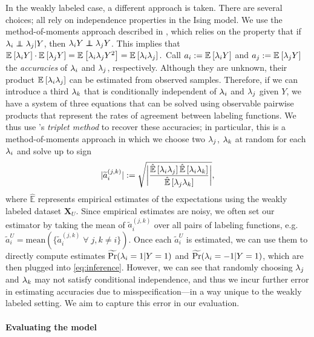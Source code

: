 In the weakly labeled case, a different approach is taken. There are several choices; all rely on independence properties in the Ising model. We use the method-of-moments approach described in \cite{fu2020fast}, which relies on the property
that if $\lf_i \independent \lf_j | Y$, then $\lf_i Y \independent \lf_j Y$.
%
This implies that $\mathbb{E}_{}\left[\lambda_i Y\right] \cdot \mathbb{E}_{}\left[\lambda_j Y\right] = \mathbb{E}_{}\left[\lambda_i \lambda_j Y^2\right] = \mathbb{E}_{}\left[\lambda_i \lambda_j\right].$
Call $a_i := \mathbb{E}_{}\left[\lambda_i Y\right]$ and $a_j := \mathbb{E}_{}\left[\lambda_j Y\right]$ the \textit{accuracies} of $\lambda_i$ and $\lambda_j$, respectively. Although they are unknown, their product $\mathbb{E}_{}\left[\lambda_i \lambda_j\right]$ can be estimated from observed samples. Therefore, if we can introduce a third $\lambda_k$ that is conditionally independent of $\lambda_i$ and $\lambda_j$ given $Y$, we have a system of three equations that can be solved using observable pairwise products that represent the rates of agreement between labeling functions. We thus use \cite{fu2020fast}'s \textit{triplet method} to recover these accuracies; in particular, this is a method-of-moments approach in which we choose two $\lambda_j$, $\lambda_k$ at random for each $\lambda_i$ and solve up to sign
\begin{align}
    |\widetilde{a}_i^{(j, k)}| := \sqrt{\bigg| \frac{\hat{\mathbb{E}}\left[\lambda_i \lambda_j\right] \hat{\mathbb{E}}\left[\lambda_i \lambda_k\right]}{\hat{\mathbb{E}}\left[\lambda_j \lambda_k\right]} \bigg|},
    \label{eq:triplet}
\end{align}
where $\hat{\mathbb{E}}$ represents empirical estimates of the expectations using the weakly labeled dataset $\bm{X}_U$. Since empirical estimates are noisy, we often set our estimator by taking the mean of $\widetilde{a}_i^{(j, k)}$ over all pairs of labeling functions, e.g. $\widetilde{a}_i^U = \mathrm{mean}(\{\widetilde{a}_i^{(j, k)} \; \forall \; j, k \neq i\})$. Once each $\widetilde{a}_i^U$ is estimated, we can use them to directly compute estimates $\widetilde{\Pr}(\lambda_i = 1 | Y = 1)$ and $\widetilde{\Pr}(\lambda_i = -1 | Y = 1)$, which are then plugged into \eqref{eq:inference}. However, we can see that randomly choosing $\lambda_j$ and $\lambda_k$ may not satisfy conditional independence, and thus we incur further error in estimating accuracies due to misspecification---in a way unique to the weakly labeled setting. We aim to capture this error in our evaluation. %

\paragraph{Evaluating the model}

